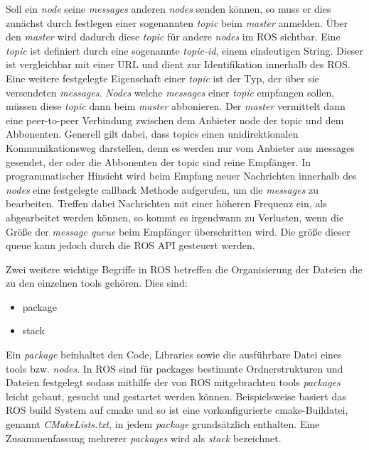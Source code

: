 Soll ein \textit{node} seine \textit{messages} anderen \textit{nodes} senden
können, so muss er dies zunächst durch festlegen einer sogenannten
\textit{topic} beim \textit{master} anmelden. Über den \textit{master} wird
dadurch diese \textit{topic} für andere \textit{nodes} im ROS sichtbar. Eine
\textit{topic} ist definiert durch eine sogenannte \textit{topic-id}, einem
eindeutigen String. Dieser ist vergleichbar mit einer URL und dient zur
Identifikation innerhalb des ROS. Eine weitere festgelegte
Eigenschaft einer \textit{topic} ist der Typ, der über sie versendeten
\textit{messages}. \textit{Nodes} welche \textit{messages} einer
\textit{topic} empfangen sollen, müssen diese \textit{topic} dann beim
\textit{master} abbonieren. Der \textit{master} vermittelt dann eine
peer-to-peer Verbindung zwischen dem Anbieter node der topic und dem
Abbonenten. Generell gilt dabei, dass topics einen unidirektionalen
Kommunikationsweg darstellen, denn es werden nur vom Anbieter aus messages
gesendet, der oder die Abbonenten der topic sind reine Empfänger. 
In programmatischer Hinsicht wird beim Empfang neuer Nachrichten innerhalb des
\textit{nodes} eine festgelegte callback Methode aufgerufen, um die
\textit{messages} zu bearbeiten. Treffen dabei Nachrichten mit einer höheren
Frequenz ein, als abgearbeitet werden können, so kommt es irgendwann zu
Verlusten, wenn die Größe der \textit{message queue} beim Empfänger überschritten
wird. Die größe dieser queue kann jedoch durch die ROS API gesteuert werden.  

Zwei weitere wichtige Begriffe in ROS betreffen die Organisierung der
Dateien die zu den einzelnen tools gehören. Dies sind:

\begin{itemize}
  \item package
  \item stack
\end{itemize}

Ein \textit{package} beinhaltet den Code, Libraries sowie die ausführbare Datei
eines tools bzw. \textit{nodes}.  In ROS sind für packages bestimmte
Ordnerstrukturen und Dateien festgelegt sodass mithilfe der von ROS
mitgebrachten tools \textit{packages} leicht gebaut, gesucht und gestartet
werden können. Beispielsweise basiert das ROS build System auf cmake und so ist
eine vorkonfigurierte cmake-Buildatei, genannt \textit{CMakeLists.txt}, in jedem
\textit{package} grundsätzlich enthalten. Eine Zusammenfassung mehrerer
\textit{packages} wird als \textit{stack} bezeichnet. 

